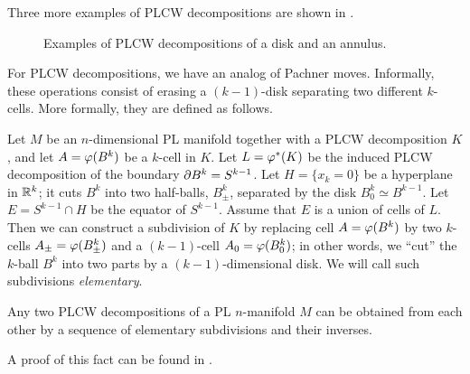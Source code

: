 Three more examples of PLCW decompositions are shown in .

\begin{figure}[ht]
  \centering
  \caption{Examples of PLCW decompositions of a disk and an annulus.}
  \label{f:plcw-examples}
\end{figure}

For PLCW decompositions, we have an analog of Pachner moves. Informally,
these operations consist of erasing a $(k-1)$-disk separating two different
$k$-cells. More formally, they are defined as follows.

Let $M$ be an $n$-dimensional PL manifold together with a PLCW
decomposition $K$, and let $A=\varphi(B^k)$ be a $k$-cell in $K$. Let
$L=\varphi^*(K)$ be the induced PLCW decomposition of the boundary $\partial
B^k=S^{k-1}$. Let $H=\{x_k=0\}$ be a hyperplane in $\mathbb{R}^k$; it cuts $B^k$
into two half-balls, $B_{\pm}^k$, separated by the disk $B_0^k\simeq
B^{k-1}$. Let $E=S^{k-1}\cap H$ be the equator of $S^{k-1}$. Assume that
$E$ is a union of cells of $L$. Then we can construct a subdivision of $K$
by replacing cell $A=\varphi(B^k)$ by two $k$-cells $A_\pm =\varphi(B_\pm^k)$ and
a $(k-1)$-cell $A_0=\varphi(B_0^k)$; in other words, we ``cut'' the $k$-ball
$B^k$ into two parts by a $(k-1)$-dimensional disk. We will call such
subdivisions \emph{elementary}.

\begin{theorem}\label{t:plcw-moves}
Any two PLCW decompositions of a PL $n$-manifold $M$ can be obtained from each
other by a sequence of elementary subdivisions and their inverses.
\end{theorem}
A proof of this fact can be found in .

